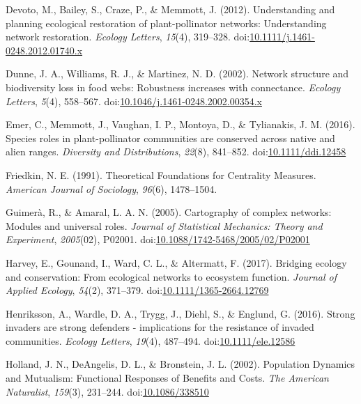 \documentclass[a4paper]{artikel1}
\theoremstyle{definition}
\theoremstyle{definition}
\theoremstyle{definition}
\theoremstyle{remark}
\begin{document}
\hypertarget{ref-devoto_understanding_2012}{}
Devoto, M., Bailey, S., Craze, P., \& Memmott, J. (2012). Understanding
and planning ecological restoration of plant-pollinator networks:
Understanding network restoration. \emph{Ecology Letters}, \emph{15}(4),
319--328.
doi:\href{https://doi.org/10.1111/j.1461-0248.2012.01740.x}{10.1111/j.1461-0248.2012.01740.x}

\hypertarget{ref-dunne_network_2002}{}
Dunne, J. A., Williams, R. J., \& Martinez, N. D. (2002). Network
structure and biodiversity loss in food webs: Robustness increases with
connectance. \emph{Ecology Letters}, \emph{5}(4), 558--567.
doi:\href{https://doi.org/10.1046/j.1461-0248.2002.00354.x}{10.1046/j.1461-0248.2002.00354.x}

\hypertarget{ref-emer_species_2016}{}
Emer, C., Memmott, J., Vaughan, I. P., Montoya, D., \& Tylianakis, J. M.
(2016). Species roles in plant-pollinator communities are conserved
across native and alien ranges. \emph{Diversity and Distributions},
\emph{22}(8), 841--852.
doi:\href{https://doi.org/10.1111/ddi.12458}{10.1111/ddi.12458}

\hypertarget{ref-noah_e._friedkin_theoretical_1991}{}
Friedkin, N. E. (1991). Theoretical Foundations for Centrality Measures.
\emph{American Journal of Sociology}, \emph{96}(6), 1478--1504.

\hypertarget{ref-guimera_cartography_2005}{}
Guimerà, R., \& Amaral, L. A. N. (2005). Cartography of complex
networks: Modules and universal roles. \emph{Journal of Statistical
Mechanics: Theory and Experiment}, \emph{2005}(02), P02001.
doi:\href{https://doi.org/10.1088/1742-5468/2005/02/P02001}{10.1088/1742-5468/2005/02/P02001}

\hypertarget{ref-harvey_bridging_2017}{}
Harvey, E., Gounand, I., Ward, C. L., \& Altermatt, F. (2017). Bridging
ecology and conservation: From ecological networks to ecosystem
function. \emph{Journal of Applied Ecology}, \emph{54}(2), 371--379.
doi:\href{https://doi.org/10.1111/1365-2664.12769}{10.1111/1365-2664.12769}

\hypertarget{ref-henriksson_strong_2016}{}
Henriksson, A., Wardle, D. A., Trygg, J., Diehl, S., \& Englund, G.
(2016). Strong invaders are strong defenders - implications for the
resistance of invaded communities. \emph{Ecology Letters}, \emph{19}(4),
487--494.
doi:\href{https://doi.org/10.1111/ele.12586}{10.1111/ele.12586}

\hypertarget{ref-holland_population_2002}{}
Holland, J. N., DeAngelis, D. L., \& Bronstein, J. L. (2002). Population
Dynamics and Mutualism: Functional Responses of Benefits and Costs.
\emph{The American Naturalist}, \emph{159}(3), 231--244.
doi:\href{https://doi.org/10.1086/338510}{10.1086/338510}
\end{document}
